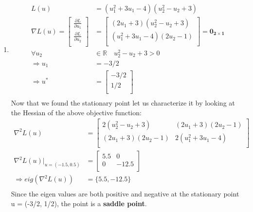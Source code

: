 \begin{enumerate}
\begin{enumerate}
  \item %
  \begin{align*}
    L(u) &= (u_1^2 + 3 u_1 - 4) (u_2 ^2 - u_2 + 3) \\
    \nabla L(u) = \begin{bmatrix}
			  \frac{\partial L}{\partial u_1} \\[6pt]
			  \frac{\partial L}{\partial u_2} \\
			  \end{bmatrix}  &= 
			  \begin{bmatrix}
			    (2 u_1 + 3) (u_2^2 -u_2 + 3) \\
			    (u_1^2 + 3u_1 -4) (2 u_2 -1) \\
			    \end{bmatrix}  = \mathbf{0_{2\times1}}\\[6pt]
	\forall u_2 &\in \mathbb{R} \quad u_2^2 - u_2 + 3 > 0 \\	 
	\Rightarrow u_1 &= -3/2 \\
	\Rightarrow u^* &= \begin{bmatrix}
	                 -3/2 \\
	                 1/2 \\
	                \end{bmatrix}\\
  \end{align*}
  Now that we found the stationary point let us characterize it by looking at
the Hessian of the above objective function:
  \begin{align*}
   \nabla^2 L(u) &= \begin{bmatrix}
                    2 (u_2^2 -u_2 + 3) & (2u_1+3)(2u_2-1) \\
                    (2u_1+3)(2u_2 - 1) & 2(u_1^2 +3 u_1 - 4) \\
                   \end{bmatrix} \\
    \nabla^2 L(u) |_{u = (-1.5,0.5)} &= \begin{bmatrix}
                                         5.5 & 0 \\
                                         0 & -12.5\\
                                        \end{bmatrix}\\
     \Rightarrow eig(\nabla^2 L(u)) &= \{ 5.5,-12.5\} \\
  \end{align*}
  Since the eigen values are both positive and negative at the stationary point
u = (-3/2, 1/2), the point is a \textbf{saddle point}. 
  \end{enumerate}
  

\end{enumerate}
